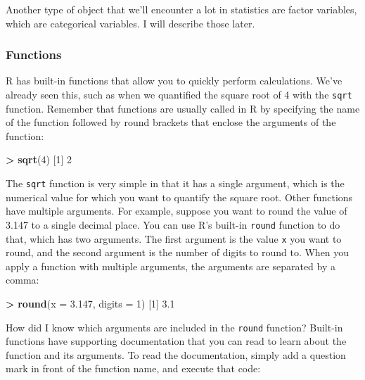 \documentclass[
]{book}
\newenvironment{Shaded}{\begin{snugshade}}{\end{snugshade}}
\newcommand{\AttributeTok}[1]{\textcolor[rgb]{0.13,0.29,0.53}{#1}}
\newcommand{\DecValTok}[1]{\textcolor[rgb]{0.00,0.00,0.81}{#1}}
\newcommand{\FloatTok}[1]{\textcolor[rgb]{0.00,0.00,0.81}{#1}}
\newcommand{\FunctionTok}[1]{\textcolor[rgb]{0.13,0.29,0.53}{\textbf{#1}}}
\newcommand{\NormalTok}[1]{#1}
\newcommand{\SpecialCharTok}[1]{\textcolor[rgb]{0.81,0.36,0.00}{\textbf{#1}}}
\begin{document}
Another type of object that we'll encounter a lot in statistics are factor variables, which are categorical variables. I will describe those later.

\subsubsection{Functions}\label{functions}

R has built-in functions that allow you to quickly perform calculations. We've already seen this, such as when we quantified the square root of 4 with the \texttt{sqrt} function. Remember that functions are usually called in R by specifying the name of the function followed by round brackets that enclose the arguments of the function:

\begin{Shaded}
\begin{Highlighting}[]
\SpecialCharTok{\textgreater{}} \FunctionTok{sqrt}\NormalTok{(}\DecValTok{4}\NormalTok{)}
\NormalTok{[}\DecValTok{1}\NormalTok{] }\DecValTok{2}
\end{Highlighting}
\end{Shaded}

The \texttt{sqrt} function is very simple in that it has a single argument, which is the numerical value for which you want to quantify the square root. Other functions have multiple arguments. For example, suppose you want to round the value of 3.147 to a single decimal place. You can use R's built-in \texttt{round} function to do that, which has two arguments. The first argument is the value \texttt{x} you want to round, and the second argument is the number of digits to round to. When you apply a function with multiple arguments, the arguments are separated by a comma:

\begin{Shaded}
\begin{Highlighting}[]
\SpecialCharTok{\textgreater{}} \FunctionTok{round}\NormalTok{(}\AttributeTok{x =} \FloatTok{3.147}\NormalTok{, }\AttributeTok{digits =} \DecValTok{1}\NormalTok{)}
\NormalTok{[}\DecValTok{1}\NormalTok{] }\FloatTok{3.1}
\end{Highlighting}
\end{Shaded}

How did I know which arguments are included in the \texttt{round} function? Built-in functions have supporting documentation that you can read to learn about the function and its arguments. To read the documentation, simply add a question mark in front of the function name, and execute that code:
\end{document}
